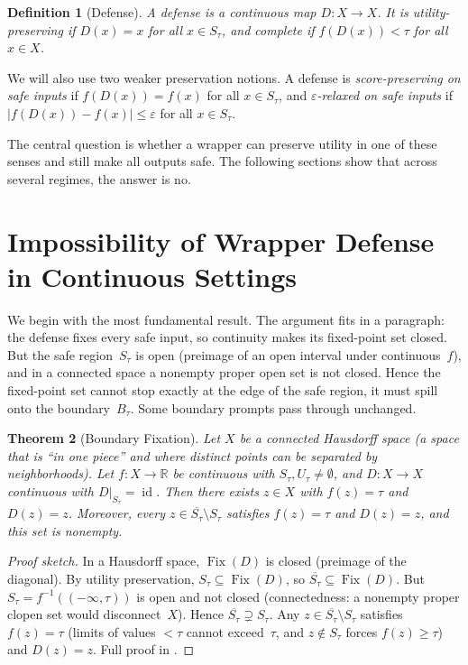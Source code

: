 \documentclass[11pt]{article}
\newtheorem{theorem}{Theorem}[section]
\newtheorem{definition}[theorem]{Definition}
\newcommand{\R}{\mathbb{R}}
\newcommand{\cl}[1]{\overline{#1}}
\newcommand{\Fix}{\operatorname{Fix}}
\newcommand{\id}{\operatorname{id}}
\begin{document}
\begin{definition}[Defense]
\label{def:defense}
A \emph{defense} is a continuous map $D\colon X \to X$. It is
\emph{utility-preserving} if $D(x) = x$ for all $x \in S_\tau$, and
\emph{complete} if $f(D(x)) < \tau$ for all $x\in X$.
\end{definition}

We will also use two weaker preservation notions. A defense is
\emph{score-preserving on safe inputs} if $f(D(x)) = f(x)$ for all
$x \in S_\tau$, and \emph{$\varepsilon$-relaxed on safe inputs} if
$|f(D(x)) - f(x)| \leq \varepsilon$ for all $x \in S_\tau$.

The central question is whether a wrapper can preserve utility in one
of these senses and still make all outputs safe. The following sections
show that across several regimes, the answer is no.


\section{Impossibility of Wrapper Defense in Continuous Settings}
\label{sec:boundary}

We begin with the most fundamental result. The argument fits in a
paragraph: the defense fixes every safe input, so continuity makes its
fixed-point set closed. But the safe region~$S_\tau$ is open (preimage
of an open interval under continuous~$f$), and in a connected space a
nonempty proper open set is not closed. Hence the fixed-point set
cannot stop exactly at the edge of the safe region, it must spill onto
the boundary~$B_\tau$. Some boundary prompts pass through unchanged.

\begin{theorem}[Boundary Fixation]
\label{thm:main}
Let $X$ be a connected Hausdorff space (a space that is ``in one
piece'' and where distinct points can be separated by neighborhoods).
Let $f\colon X\to\R$ be continuous with $S_\tau, U_\tau \neq
\emptyset$, and $D\colon X \to X$ continuous with
$D|_{S_\tau} = \id$. Then there exists $z\in X$ with $f(z) = \tau$
and $D(z) = z$. Moreover, every $z \in \cl{S_\tau} \setminus S_\tau$
satisfies $f(z) = \tau$ and $D(z) = z$, and this set is nonempty.
\end{theorem}

\begin{proof}[Proof sketch]
In a Hausdorff space, $\Fix(D)$ is closed (preimage of the diagonal).
By utility preservation, $S_\tau \subseteq \Fix(D)$, so
$\cl{S_\tau} \subseteq \Fix(D)$. But $S_\tau = f^{-1}((-\infty,\tau))$
is open and not closed (connectedness: a nonempty proper clopen set
would disconnect~$X$). Hence $\cl{S_\tau} \supsetneq S_\tau$. Any
$z \in \cl{S_\tau}\setminus S_\tau$ satisfies $f(z) = \tau$ (limits of
values ${<}\tau$ cannot exceed~$\tau$, and $z \notin S_\tau$ forces
$f(z) \geq \tau$) and $D(z) = z$. Full proof in .
\end{proof}
\end{document}
